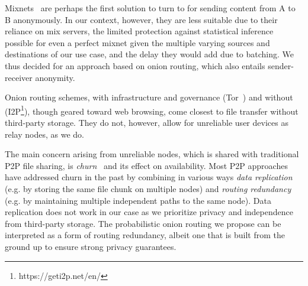 Mixnets~\cite{Chaum:1981} are perhaps the first solution to turn to for sending content from A to B anonymously. In our context, however, they are less suitable due to their reliance on mix servers, the limited protection against statistical inference possible for even a perfect mixnet given the multiple varying sources and destinations of our use case, and the delay they would add due to batching. We thus decided for an approach based on onion routing, which also entails sender-receiver anonymity.

Onion routing schemes, with infrastructure and governance (Tor~\cite{Tor}) and without (I2P\footnote{https://geti2p.net/en/}), though geared toward web browsing, come closest to file transfer without third-party storage. They do not, however, allow for unreliable user devices as relay nodes, as we do. 

The main concern arising from unreliable nodes, which is shared with traditional P2P file sharing, is \emph{churn}~\cite{dhtchurn} and its effect on availability. %
Most P2P approaches have addressed churn in the past by combining in various ways \emph{data replication} (e.g. by storing the same file chunk on multiple nodes) and \emph{routing redundancy} (e.g. by maintaining multiple independent paths to the same node). Data replication does not work in our case as we prioritize privacy and independence from third-party storage. The probabilistic onion routing we propose can be interpreted as a form of routing redundancy, albeit one that is built from the ground up to ensure strong privacy guarantees.





